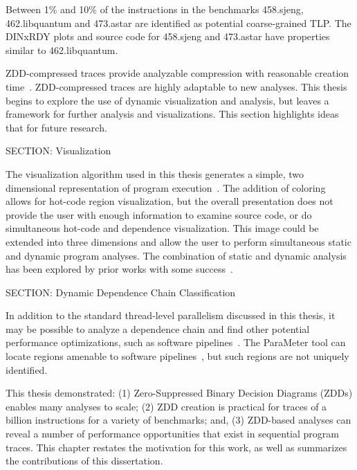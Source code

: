 {Between 1\% and 10\% of the instructions in the benchmarks 458.sjeng, 462.libquantum and 473.astar are identified as potential coarse-grained TLP. The DINxRDY plots and source code for 458.sjeng and 473.astar have properties similar to 462.libquantum.


ZDD-compressed traces provide analyzable compression with reasonable creation time~\cite{price:10:cgo}.  ZDD-compressed traces are highly adaptable to new analyses.  This thesis begins to explore the use of dynamic visualization and analysis, but leaves a framework for further analysis and visualizations.  This section highlights ideas that for future research.

SECTION: Visualization


The visualization algorithm used in this thesis generates a simple, two dimensional representation of program execution~\cite{price:08:pact}.  The addition of coloring allows for hot-code region visualization, but the overall presentation does not provide the user with enough information to examine source code, or do simultaneous hot-code and dependence visualization.  This image could be extended into three dimensions and allow the user to perform simultaneous static and dynamic program analyses.  The combination of static and dynamic analysis has been explored by prior works with some success~\cite{eisenbarth:01:icsm,park:93:rts,lindlan:2000:tsf}.

SECTION: Dynamic Dependence Chain Classification


In addition to the standard thread-level parallelism discussed in this thesis, it may be possible to analyze a dependence chain and find other potential performance optimizations, such as software pipelines~\cite{ebcioglu:87:wmm,jones:91:wmm,Allan:1995rt}.  The ParaMeter tool can locate regions amenable to software pipelines~\cite{price:08:pact}, but such regions are not uniquely identified.


This thesis demonstrated: (1) Zero-Suppressed Binary Decision Diagrams (ZDDs) enables many analyses to scale; (2) ZDD creation is practical for traces of a billion instructions for a variety of benchmarks; and, (3) ZDD-based analyses can reveal a number of performance opportunities that exist in sequential program traces.  This chapter restates the motivation for this work, as well as summarizes the contributions of this dissertation.

}
